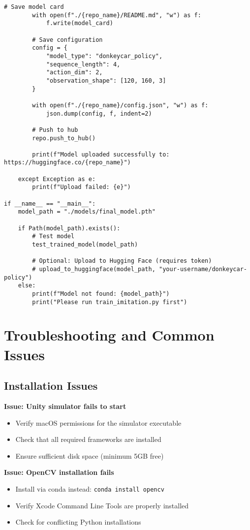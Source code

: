 \documentclass[11pt,a4paper]{article}
\begin{document}
\begin{lstlisting}[style=pythonstyle, caption={Model deployment utilities (deploy\_model.py)}]
        # Save model card
        with open(f"./{repo_name}/README.md", "w") as f:
            f.write(model_card)
        
        # Save configuration
        config = {
            "model_type": "donkeycar_policy",
            "sequence_length": 4,
            "action_dim": 2,
            "observation_shape": [120, 160, 3]
        }
        
        with open(f"./{repo_name}/config.json", "w") as f:
            json.dump(config, f, indent=2)
        
        # Push to hub
        repo.push_to_hub()
        
        print(f"Model uploaded successfully to: https://huggingface.co/{repo_name}")
        
    except Exception as e:
        print(f"Upload failed: {e}")

if __name__ == "__main__":
    model_path = "./models/final_model.pth"
    
    if Path(model_path).exists():
        # Test model
        test_trained_model(model_path)
        
        # Optional: Upload to Hugging Face (requires token)
        # upload_to_huggingface(model_path, "your-username/donkeycar-policy")
    else:
        print(f"Model not found: {model_path}")
        print("Please run train_imitation.py first")
\end{lstlisting}

\section{Troubleshooting and Common Issues}

\subsection{Installation Issues}

\textbf{Issue: Unity simulator fails to start}
\begin{itemize}
    \item Verify macOS permissions for the simulator executable
    \item Check that all required frameworks are installed
    \item Ensure sufficient disk space (minimum 5GB free)
\end{itemize}

\textbf{Issue: OpenCV installation fails}
\begin{itemize}
    \item Install via conda instead: \texttt{conda install opencv}
    \item Verify Xcode Command Line Tools are properly installed
    \item Check for conflicting Python installations
\end{itemize}
\end{document}
